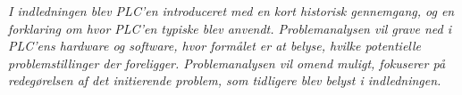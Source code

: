 \textit{I indledningen blev PLC’en introduceret med en kort historisk gennemgang, og en forklaring om hvor PLC’en typiske blev anvendt. Problemanalysen vil grave ned i PLC’ens hardware og software, hvor formålet er at belyse, hvilke potentielle problemstillinger der foreligger. Problemanalysen vil omend muligt, fokuserer på redegørelsen af det initierende problem, som tidligere blev belyst i indledningen.}

